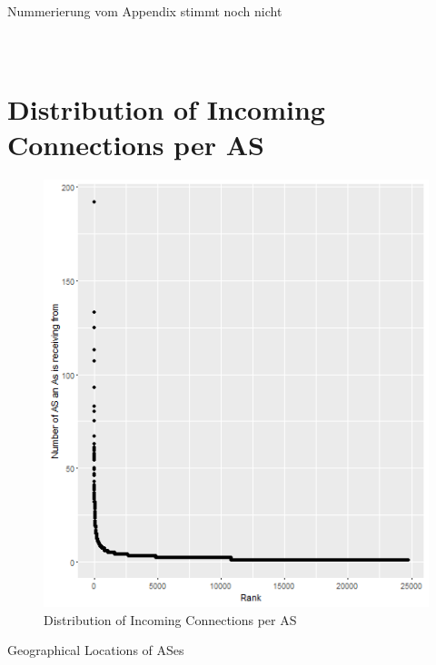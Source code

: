 \documentclass[conference, 11pt]{IEEEtran}
\begin{document}
\pagebreak




\appendix

Nummerierung vom Appendix stimmt noch nicht

\section{\\Distribution of Incoming Connections per AS}


\begin{figure}[htbp]
\centerline{\includegraphics[scale=0.4]{Graphics/AsToDistribution.png}}
\caption{Distribution of Incoming Connections per AS}
\label{fig}
\end{figure}


Geographical Locations of ASes
\end{document}
